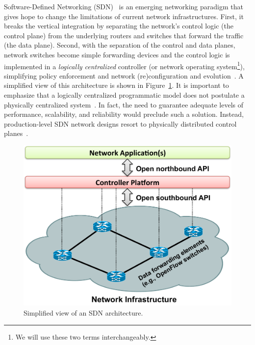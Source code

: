 Software-Defined Networking (SDN)~\cite{mckeown2011,schenker2011} 
 is an emerging networking paradigm that gives hope to change the limitations of current
 network infrastructures. First, it breaks the vertical integration by separating the network's 
control logic (the control plane) from the underlying routers and switches that 
forward the traffic (the data plane). Second, with the separation of the control
and data planes, network switches become simple forwarding devices and
the control logic is implemented in a \textit{logically centralized} controller (or network operating system\footnote{We will use these two
terms interchangeably.}), simplifying policy enforcement and network 
(re)configuration and evolution~\cite{kim2013}. A simplified view of this 
architecture is shown in Figure~\ref{fig:sdn_simple}.  It is important
to emphasize that a logically centralized programmatic model does not
postulate a physically centralized system~\cite{koponen-1}.  In fact, the need to
guarantee adequate levels of performance, scalability, and reliability
would preclude such a solution.  Instead,
production-level SDN network designs resort to physically distributed
control planes~\cite{koponen-1,jain2013-1}.



\begin{figure}[t!]
\centering
\includegraphics[width=0.95\columnwidth]{figures/fig1_sdn_simple.pdf}
\caption{Simplified view of an SDN architecture.}
\label{fig:sdn_simple}
\end{figure}

